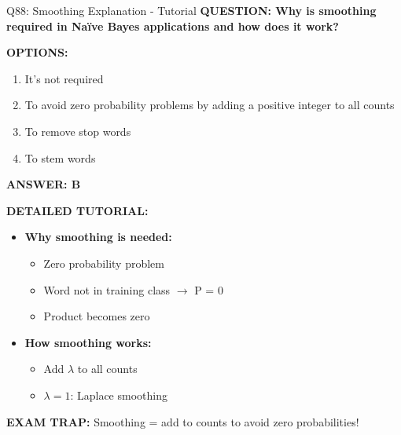 \documentclass[8pt]{beamer}
\begin{document}
	\begin{frame}{Q88: Smoothing Explanation - Tutorial}
		\fontsize{6.5}{7.5}\selectfont
		\textbf{QUESTION: Why is smoothing required in Naïve Bayes applications and how does it work?}
		
		\vspace{0.1cm}
		\textbf{OPTIONS:}
		\begin{enumerate}
			\item It's not required
			\item To avoid zero probability problems by adding a positive integer to all counts
			\item To remove stop words
			\item To stem words
		\end{enumerate}
		
		\vspace{0.1cm}
		\textcolor{myblue}{\textbf{ANSWER: B}}
		
		\vspace{0.1cm}
		\textbf{DETAILED TUTORIAL:}
		\begin{itemize}
			\item \textbf{Why smoothing is needed:}
			\begin{itemize}
				\item Zero probability problem
				\item Word not in training class $\to$ P = 0
				\item Product becomes zero
			\end{itemize}
			\item \textbf{How smoothing works:}
			\begin{itemize}
				\item Add $\lambda$ to all counts
				\item $\lambda = 1$: Laplace smoothing
			\end{itemize}
		\end{itemize}
		
		\textcolor{myred}{\textbf{EXAM TRAP:}} Smoothing = \textcolor{myblue}{add to counts to avoid zero probabilities}!
	\end{frame}
	
\end{document}
